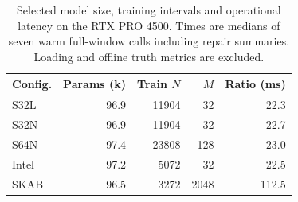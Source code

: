 \begin{table}[t]
\centering
\caption{Selected model size, training intervals and operational latency on the RTX PRO 4500. Times are medians of seven warm full-window calls including repair summaries. Loading and offline truth metrics are excluded.}
\label{tab:runtime}
\small
\begin{tabular}{lrrrr}
\toprule
Config. & Params (k) & Train $N$ & $M$ & Ratio (ms) \\
\midrule
S32L & 96.9 & 11904 & 32 & 22.3 \\
S32N & 96.9 & 11904 & 32 & 22.7 \\
S64N & 97.4 & 23808 & 128 & 23.0 \\
Intel & 97.2 & 5072 & 32 & 22.5 \\
SKAB & 96.5 & 3272 & 2048 & 112.5 \\
\bottomrule
\end{tabular}
\end{table}
